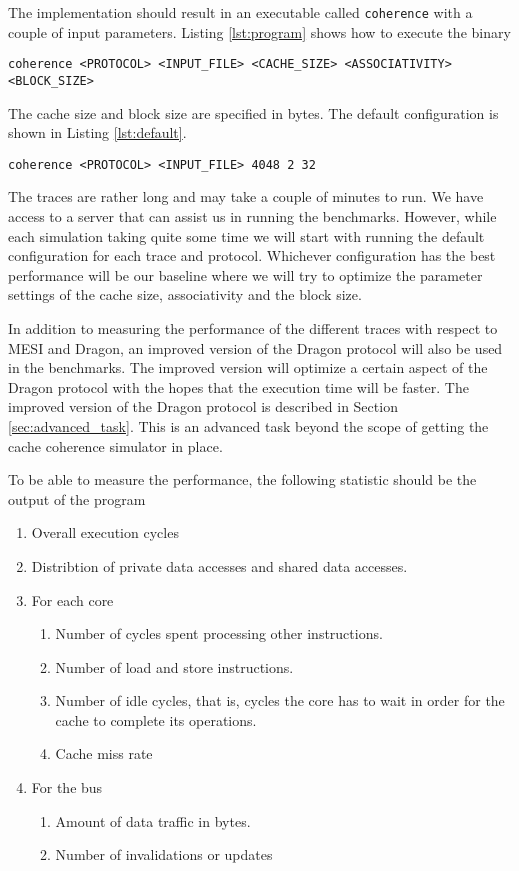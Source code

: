 The implementation should result in an executable called \texttt{coherence} with a couple of input parameters. Listing \ref{lst:program} shows how to execute the binary
\begin{lstlisting}[label=lst:program]
coherence <PROTOCOL> <INPUT_FILE> <CACHE_SIZE> <ASSOCIATIVITY> <BLOCK_SIZE>
\end{lstlisting}
The cache size and block size are specified in bytes.
The default configuration is shown in Listing \ref{lst:default}.
\begin{lstlisting}[label=lst:default]
coherence <PROTOCOL> <INPUT_FILE> 4048 2 32 
\end{lstlisting}
The traces are rather long and may take a couple of minutes to run.
We have access to a server that can assist us in running the benchmarks.
However, while each simulation taking quite some time we will start with running the default configuration for each trace and protocol.
Whichever configuration has the best performance will be our baseline where we will try to optimize the parameter settings of the cache size, associativity and the block size.

In addition to measuring the performance of the different traces with respect to MESI and Dragon, an improved version of the Dragon protocol will also be used in the benchmarks. 
The improved version will optimize a certain aspect of the Dragon protocol with the hopes that the execution time will be faster.
The improved version of the Dragon protocol is described in Section \ref{sec:advanced_task}.
This is an advanced task beyond the scope of getting the cache coherence simulator in place.

To be able to measure the performance, the following statistic should be the output of the program
\begin{enumerate}
    \item Overall execution cycles
    \item Distribtion of private data accesses and shared data accesses.
    \item For each core
    \begin{enumerate}
        \item Number of cycles spent processing other instructions.
        \item Number of load and store instructions.
        \item Number of idle cycles, that is, cycles the core has to wait in order for the cache to complete its operations.
        \item Cache miss rate
    \end{enumerate}
    \item For the bus
    \begin{enumerate}
        \item Amount of data traffic in bytes.
        \item Number of invalidations or updates
    \end{enumerate}
\end{enumerate}




